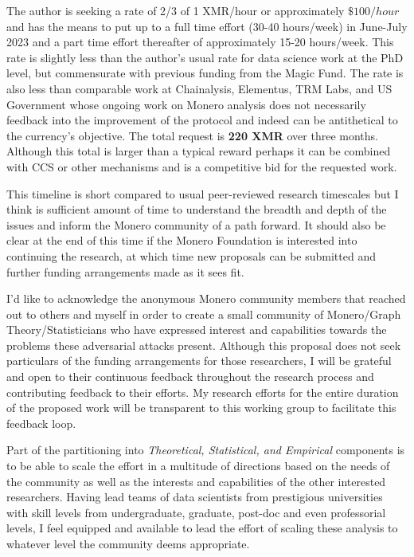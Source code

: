 \documentclass[prc, 12pt]{revtex4-1}
\begin{document}
The author is seeking a rate of 2/3 of 1 XMR/hour or approximately $\$100/hour$ and has the means to put up to a full time effort (30-40 hours/week) in June-July 2023 and a part time effort thereafter of approximately 15-20 hours/week.  This rate is slightly less than the author's usual rate for data science work at the PhD level, but commensurate with previous funding from the Magic Fund.  The rate is also less than comparable work at Chainalysis, Elementus, TRM Labs, and US Government whose ongoing work on Monero analysis does not necessarily feedback into the improvement of the protocol and indeed can be antithetical to the currency's objective.  The total request is \textbf{220 XMR} over three months.  Although this total is larger than a typical reward perhaps it can be combined with CCS or other mechanisms and is a competitive bid for the requested work.

This timeline is short compared to usual peer-reviewed research timescales but I think is sufficient amount of time to understand the breadth and depth of the issues and inform the Monero community of a path forward.  It should also be clear at the end of this time if the Monero Foundation is interested into continuing the research, at which time new proposals can be submitted and further funding arrangements made as it sees fit.

I'd like to acknowledge the anonymous Monero community members that reached out to others and myself in order to create a small community of Monero/Graph Theory/Statisticians who have expressed interest and capabilities towards the problems these adversarial attacks present.  Although this proposal does not seek particulars of the funding arrangements for those researchers, I will be grateful and open to their continuous feedback throughout the research process and contributing feedback to their efforts.  My research efforts for the entire duration of the proposed work will be transparent to this working group to facilitate this feedback loop.  

Part of the partitioning into \textit{Theoretical, Statistical, and Empirical} components is to be able to scale the effort in a multitude of directions based on the needs of the community as well as the interests and capabilities of the other interested researchers.  Having lead teams of data scientists from prestigious universities with skill levels from undergraduate, graduate, post-doc and even professorial levels, I feel equipped and available to lead the effort of scaling these analysis to whatever level the community deems appropriate.  
\end{document}
